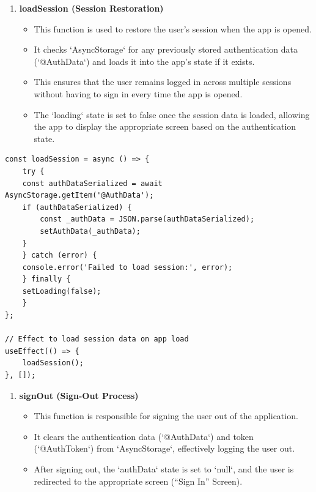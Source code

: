 \begin{enumerate}[resume]
    \item \textbf{loadSession (Session Restoration)}
    \begin{itemize}
        \item This function is used to restore the user’s session when the app is opened.
        \item It checks `AsyncStorage` for any previously stored authentication data (`@AuthData`) and loads it into the app’s state if it exists.
        \item This ensures that the user remains logged in across multiple sessions without having to sign in every time the app is opened.
        \item The `loading` state is set to false once the session data is loaded, allowing the app to display the appropriate screen based on the authentication state.
    \end{itemize}
\end{enumerate}

\begin{lstlisting}[caption={Load Session}]
const loadSession = async () => {
    try {
    const authDataSerialized = await AsyncStorage.getItem('@AuthData');
    if (authDataSerialized) {
        const _authData = JSON.parse(authDataSerialized);
        setAuthData(_authData);
    }
    } catch (error) {
    console.error('Failed to load session:', error);
    } finally {
    setLoading(false);
    }
};

// Effect to load session data on app load
useEffect(() => {
    loadSession();
}, []);
\end{lstlisting}

\begin{enumerate}[resume]
    \item \textbf{signOut (Sign-Out Process)}
    \begin{itemize}
        \item This function is responsible for signing the user out of the application.
        \item It clears the authentication data (`@AuthData`) and token (`@AuthToken`) from `AsyncStorage`, effectively logging the user out.
        \item After signing out, the `authData` state is set to `null`, and the user is redirected to the appropriate screen (``Sign In'' Screen).
    \end{itemize}
\end{enumerate}

